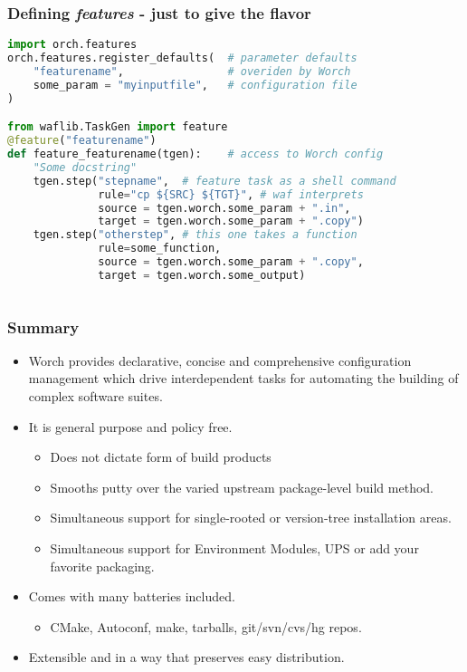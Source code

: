 \documentclass[xcolor=dvipsnames]{beamer}
\begin{document}
\begin{frame}[fragile]
  \frametitle{Defining \textit{features} - just to give the flavor}

  \begin{lstlisting}[language=Python]
import orch.features
orch.features.register_defaults(  # parameter defaults
    "featurename",                # overiden by Worch 
    some_param = "myinputfile",   # configuration file
)

from waflib.TaskGen import feature
@feature("featurename")
def feature_featurename(tgen):    # access to Worch config
    "Some docstring"
    tgen.step("stepname",  # feature task as a shell command
              rule="cp ${SRC} ${TGT}", # waf interprets
              source = tgen.worch.some_param + ".in",
              target = tgen.worch.some_param + ".copy")
    tgen.step("otherstep", # this one takes a function
              rule=some_function,
              source = tgen.worch.some_param + ".copy", 
              target = tgen.worch.some_output)
    
  \end{lstlisting}
\end{frame}

\begin{frame}
  \frametitle{Summary}
  \begin{itemize}
  \item Worch provides declarative, concise and comprehensive
    configuration management which drive interdependent tasks
    for automating the building of complex software suites.
  \item It is general purpose and policy free.
    \begin{itemize}
    \item Does not dictate form of build products
    \item Smooths putty over the varied upstream package-level build method.
    \item Simultaneous support for single-rooted or version-tree
      installation areas.
    \item Simultaneous support for Environment Modules, UPS or add
      your favorite packaging.
    \end{itemize}
  \item Comes with many batteries included.
    \begin{itemize}
    \item CMake, Autoconf, make, tarballs, git/svn/cvs/hg repos.
    \end{itemize}
  \item Extensible and in a way that preserves easy distribution.
  \end{itemize}
\end{frame}
\end{document}
